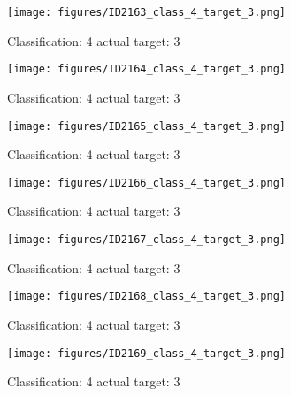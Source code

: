 \begin{figure}[h!]
\begin{center}
\texttt{[image: figures/ID2163\_class\_4\_target\_3.png]}
\end{center}
\caption{ Classification: 4 actual target: 3}
\label{fig:ID2163_class_4_target_3}
\end{figure}
\begin{figure}[h!]
\begin{center}
\texttt{[image: figures/ID2164\_class\_4\_target\_3.png]}
\end{center}
\caption{ Classification: 4 actual target: 3}
\label{fig:ID2164_class_4_target_3}
\end{figure}
\begin{figure}[h!]
\begin{center}
\texttt{[image: figures/ID2165\_class\_4\_target\_3.png]}
\end{center}
\caption{ Classification: 4 actual target: 3}
\label{fig:ID2165_class_4_target_3}
\end{figure}
\begin{figure}[h!]
\begin{center}
\texttt{[image: figures/ID2166\_class\_4\_target\_3.png]}
\end{center}
\caption{ Classification: 4 actual target: 3}
\label{fig:ID2166_class_4_target_3}
\end{figure}
\begin{figure}[h!]
\begin{center}
\texttt{[image: figures/ID2167\_class\_4\_target\_3.png]}
\end{center}
\caption{ Classification: 4 actual target: 3}
\label{fig:ID2167_class_4_target_3}
\end{figure}
\begin{figure}[h!]
\begin{center}
\texttt{[image: figures/ID2168\_class\_4\_target\_3.png]}
\end{center}
\caption{ Classification: 4 actual target: 3}
\label{fig:ID2168_class_4_target_3}
\end{figure}
\begin{figure}[h!]
\begin{center}
\texttt{[image: figures/ID2169\_class\_4\_target\_3.png]}
\end{center}
\caption{ Classification: 4 actual target: 3}
\label{fig:ID2169_class_4_target_3}
\end{figure}
